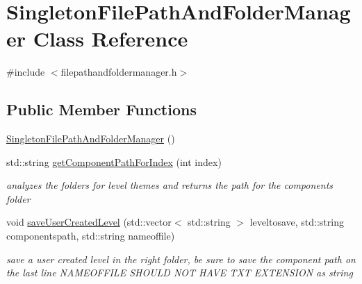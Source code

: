 \hypertarget{class_singleton_file_path_and_folder_manager}{}\section{Singleton\+File\+Path\+And\+Folder\+Manager Class Reference}
\label{class_singleton_file_path_and_folder_manager}


{\ttfamily \#include $<$filepathandfoldermanager.\+h$>$}

\subsection*{Public Member Functions}
\begin{DoxyCompactItemize}
\item 
\hyperlink{class_singleton_file_path_and_folder_manager_a598800592aee8d9e19465261714c2f28}{Singleton\+File\+Path\+And\+Folder\+Manager} ()
\item 
\hypertarget{class_singleton_file_path_and_folder_manager_a6363abc3a6dedef4ec5fcc99a50f93db}{}\label{class_singleton_file_path_and_folder_manager_a6363abc3a6dedef4ec5fcc99a50f93db} 
std\+::string \hyperlink{class_singleton_file_path_and_folder_manager_a6363abc3a6dedef4ec5fcc99a50f93db}{get\+Component\+Path\+For\+Index} (int index)
\begin{DoxyCompactList}\small\item\em analyzes the folders for level themes and returns the path for the components folder \end{DoxyCompactList}\item 
\hypertarget{class_singleton_file_path_and_folder_manager_a7043bfe54ac517562af034803ff4c03c}{}\label{class_singleton_file_path_and_folder_manager_a7043bfe54ac517562af034803ff4c03c} 
void \hyperlink{class_singleton_file_path_and_folder_manager_a7043bfe54ac517562af034803ff4c03c}{save\+User\+Created\+Level} (std\+::vector$<$ std\+::string $>$ leveltosave, std\+::string componentspath, std\+::string nameoffile)
\begin{DoxyCompactList}\small\item\em save a user created level in the right folder, be sure to save the component path on the last line N\+A\+M\+E\+O\+F\+F\+I\+LE S\+H\+O\+U\+LD N\+OT H\+A\+VE T\+XT E\+X\+T\+E\+N\+S\+I\+ON as string \end{DoxyCompactList}\item 
\hypertarget{class_singleton_file_path_and_folder_manager_a2f44faea6179c30dbb646ffcf9de1407}{}\label{class_singleton_file_path_and_folder_manager_a2f44faea6179c30dbb646ffcf9de1407} 

\end{DoxyCompactItemize}
